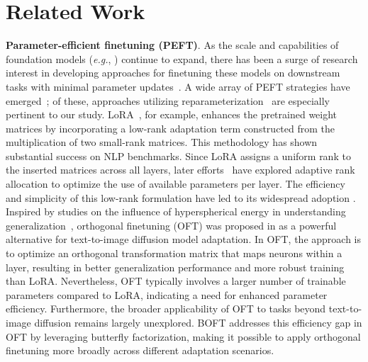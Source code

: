 \section{Related Work}

\textbf{Parameter-efficient finetuning (PEFT)}. As the scale and capabilities of foundation models (\emph{e.g.}, \cite{brown2020language,radford2021learning,rombach2022high,kirillov2023segment}) continue to expand, there has been a surge of research interest in developing approaches for finetuning these models on downstream tasks with minimal parameter updates~\cite{treviso2023efficient,ding2023parameter,lialin2023scaling}. A wide array of PEFT strategies have emerged~\cite{houlsby2019parameter,aghajanyan2020intrinsic,hulora2022,edalati2022krona,wang2022adamix,gheini2021cross,zaken2022bitfit,guo2020parameter,sung2021training,ansell2022composable,lester2021power,li2021prefix,vu2022spot,he2021towards,mao2021unipelt,karimi2021compacter,liu2022few,sung2022lst,chen2022parameter,jia2022visual,chen2022adaptformer,zhang2022neural,jie2023fact,lian2022scaling,luo2023towards}; of these, approaches utilizing reparameterization~\cite{aghajanyan2020intrinsic,hulora2022,edalati2022krona} are especially pertinent to our study. LoRA~\cite{hulora2022}, for example, enhances the pretrained weight matrices by incorporating a low-rank adaptation term constructed from the multiplication of two small-rank matrices. This methodology has shown substantial success on NLP benchmarks. Since LoRA assigns a uniform rank to the inserted matrices across all layers, later efforts~\cite{zhang2022adaptive,valipour2022dylora,zhang2023increlora} have explored adaptive rank allocation to optimize the use of available parameters per layer. The efficiency and simplicity of this low-rank formulation have led to its widespread adoption \cite{dettmers2023qlora,zi2023delta,chavan2023one}. Inspired by studies on the influence of hyperspherical energy in understanding generalization~\cite{liu2018learning,liu2021orthogonal}, orthogonal finetuning (OFT) was proposed in \cite{qiu2023controlling} as a powerful alternative for text-to-image diffusion model adaptation. In OFT, the approach is to optimize an orthogonal transformation matrix that maps neurons within a layer, resulting in better generalization performance and more robust training than LoRA. Nevertheless, OFT typically involves a larger number of trainable parameters compared to LoRA, indicating a need for enhanced parameter efficiency. Furthermore, the broader applicability of OFT to tasks beyond text-to-image diffusion remains largely unexplored. BOFT addresses this efficiency gap in OFT by leveraging butterfly factorization, making it possible to apply orthogonal finetuning more broadly across different adaptation scenarios.

